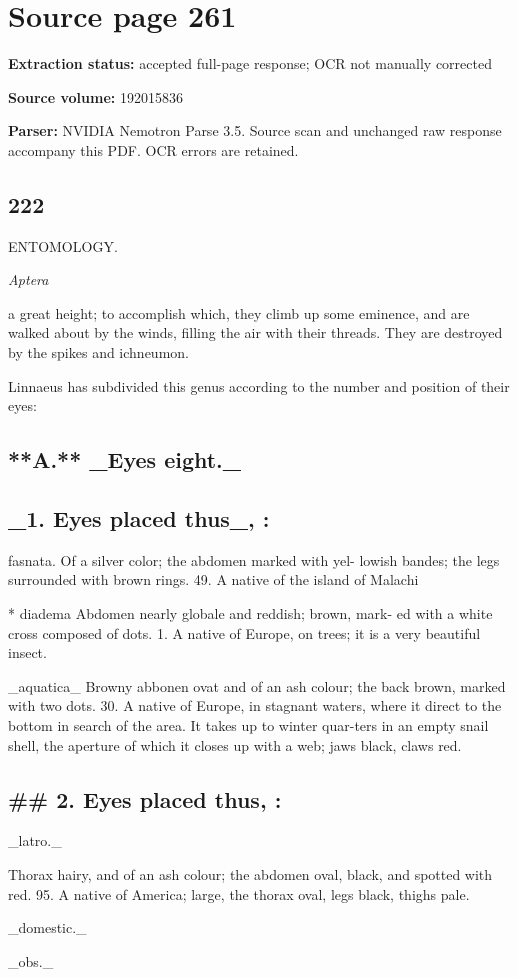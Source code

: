 \clearpage
\section{Source page 261}
\textbf{Extraction status:} accepted full-page response; OCR not manually corrected\par
\textbf{Source volume:} 192015836\par
\textbf{Parser:} NVIDIA Nemotron Parse 3.5. Source scan and unchanged raw response accompany this PDF. OCR errors are retained.\par\medskip
\subsection*{222}
ENTOMOLOGY.\par\medskip
{\small\itshape Aptera\par}\medskip
a great height; to accomplish which, they climb up some eminence, and are walked about by the winds, filling the air with their threads. They are destroyed by the spikes and ichneumon.\par\medskip
Linnaeus has subdivided this genus according to the number and position of their eyes:\par\medskip
\subsection*{**A.** \_Eyes eight.\_}
\subsection*{\_1. Eyes placed thus\_, :}
fasnata. Of a silver color; the abdomen marked with yel- lowish bandes; the legs surrounded with brown rings. 49. A native of the island of Malachi\par\medskip
* diadema Abdomen nearly globale and reddish; brown, mark- ed with a white cross composed of dots. 1. A native of Europe, on trees; it is a very beautiful insect.\par\medskip
\_aquatica\_ Browny abbonen ovat and of an ash colour; the back brown, marked with two dots. 30. A native of Europe, in stagnant waters, where it direct to the bottom in search of the area. It takes up to winter quar-ters in an empty snail shell, the aperture of which it closes up with a web; jaws black, claws red.\par\medskip
\subsection*{\#\# 2. Eyes placed thus, :}
\_latro.\_\par\medskip
Thorax hairy, and of an ash colour; the abdomen oval, black, and spotted with red. 95. A native of America; large, the thorax oval, legs black, thighs pale.\par\medskip
\_domestic.\_\par\medskip
\_obs.\_\par\medskip
